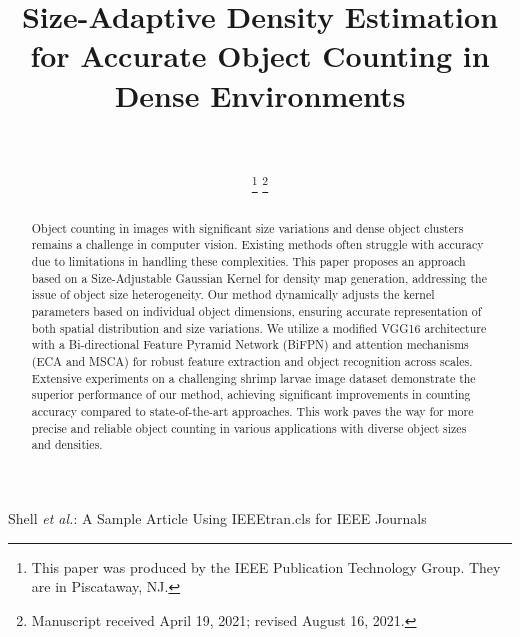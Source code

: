 \documentclass[journal]{IEEEtran}
\begin{document}
\title{Size-Adaptive Density Estimation for Accurate Object Counting in Dense Environments}

\author{\\
        \\
        \thanks{This paper was produced by the IEEE Publication Technology Group. They are in Piscataway, NJ.}%
        \thanks{Manuscript received April 19, 2021; revised August 16, 2021.}}

%
{Shell \MakeLowercase{\textit{et al.}}: A Sample Article Using IEEEtran.cls for IEEE Journals}



\maketitle

\begin{abstract}
        Object counting in images with significant size variations and dense object clusters remains a challenge in computer vision. Existing methods often struggle with accuracy due to limitations in handling these complexities. This paper proposes an approach based on a Size-Adjustable Gaussian Kernel for density map generation, addressing the issue of object size heterogeneity. Our method dynamically adjusts the kernel parameters based on individual object dimensions, ensuring accurate representation of both spatial distribution and size variations. We utilize a modified VGG16 architecture with a Bi-directional Feature Pyramid Network (BiFPN\cite{bifpn}) and attention mechanisms (ECA\cite{eca} and MSCA\cite{msca}) for robust feature extraction and object recognition across scales. Extensive experiments on a challenging shrimp larvae image dataset demonstrate the superior performance of our method, achieving significant improvements in counting accuracy compared to state-of-the-art approaches. This work paves the way for more precise and reliable object counting in various applications with diverse object sizes and densities.
\end{abstract}
\end{document}
